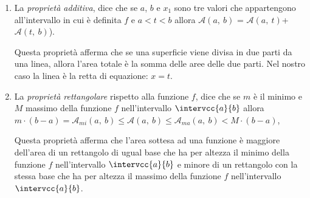 \begin{enumerate}
 \item
La \emph{proprietà additiva}, dice che se \(a\), \(b\) e \(x_1\) 
sono tre valori che appartengono all'intervallo in cui è definita \(f\) e 
\(a < t < b\)
allora \(\mathcal{A}(a,~b)\) = 
\(\mathcal{A}(a,~t)\)+\(\mathcal{A}(t,~b)\)).

\begin{minipage}{.49\textwidth}
\begin{inaccessibleblock} 
  \areasottesacurva
\end{inaccessibleblock}
\end{minipage}
\hfill
\begin{minipage}{.49\textwidth}
  \propradditiva
\end{minipage}

Questa proprietà afferma che se una superficie 
viene divisa in due parti da una linea, 
allora l'area totale è la somma delle aree delle due parti.
Nel nostro caso la linea è la retta di equazione: \(x = t\).

 \item 
La \emph{proprietà rettangolare} rispetto alla funzione \(f\), 
dice che se \(m\) è il minimo e \(M\) massimo della funzione \(f\) 
nell'intervallo \(\intervcc{a}{b}\)
allora \\
\(m\cdot(b-a) = \mathcal{A}_{mi}(a,~b) \leq \mathcal{A}(a,~b) \leq
                       \mathcal{A}_{ma}(a,~b) < M\cdot(b-a)\),

\begin{minipage}{.49\textwidth}
\begin{inaccessibleblock} 
  \areaminore
\end{inaccessibleblock}
\end{minipage}
\hfill
\begin{minipage}{.49\textwidth}
\begin{inaccessibleblock} 
  \areamaggiore
\end{inaccessibleblock}
\end{minipage}

Questa proprietà afferma che l'area sottesa ad una funzione è maggiore 
dell'area di un rettangolo di ugual base che ha per altezza il minimo della 
funzione \(f\) nell'intervallo \(\intervcc{a}{b}\) 
e minore di un rettangolo con la stessa base che ha per altezza il massimo 
della funzione \(f\) nell'intervallo \(\intervcc{a}{b}\). 
\end{enumerate}

